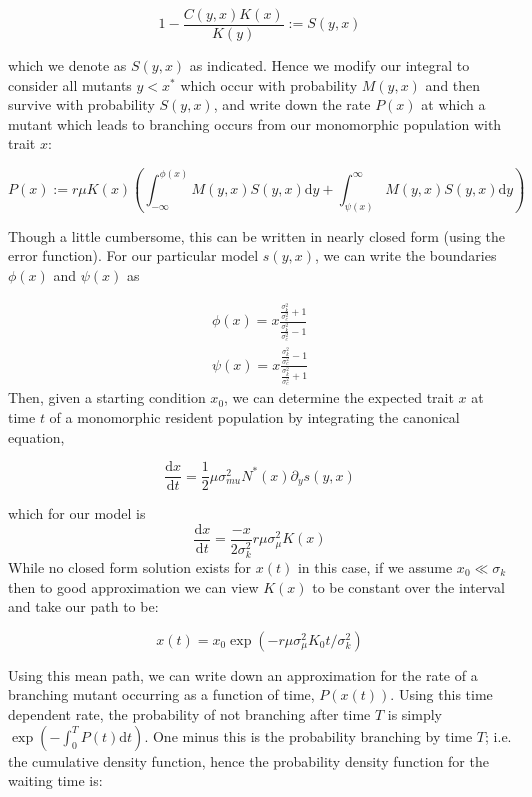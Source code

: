 \documentclass[authoryear,review,11pt]{elsarticle}
\newcommand{\ud}{\mathrm{d}}
\begin{document}
\begin{equation}
1-\frac{C(y,x)K(x)}{K(y)} := S(y,x)
\label{S}
\end{equation}

which we denote as $S(y,x)$ as indicated. Hence we modify our integral to consider all mutants $y < x^*$ which occur with probability $M(y,x)$ and then survive with probability $S(y,x)$, and write down the rate $P(x)$ at which a mutant which leads to branching occurs from our monomorphic population with trait $x$:

\begin{equation}
P(x) := r \mu K(x)\left( \int_{-\infty}^{\phi(x)} M(y,x) S(y,x) \ud y + \int_{\psi(x)}^{\infty} M(y,x) S(y,x) \ud y  \right)
\label{MSerf}
\end{equation}

Though a little cumbersome, this can be written in nearly closed form (using the error function). For our particular model $s(y,x)$, we can write the boundaries $\phi(x)$ and $\psi(x)$ as 

\begin{align}
\phi(x) = x\frac{\frac{\sigma_k^2}{\sigma_c^2}+1}{\frac{\sigma_k^2}{\sigma_c^2}-1} \nonumber \\
\psi(x) = x\frac{\frac{\sigma_k^2}{\sigma_c^2}-1}{\frac{\sigma_k^2}{\sigma_c^2}+1}
\label{phipsi}
\end{align}
Then, given a starting condition $x_0$, we can determine the expected trait $x$ at time $t$ of a monomorphic resident population by integrating the canonical equation,

\begin{equation}
\frac{\ud x}{\ud t} = \frac{1}{2} \mu \sigma_{mu}^2 N^*(x) \partial_y s(y,x)
\end{equation}

which for our model is  
\begin{equation}
\frac{\ud x}{\ud t} = \frac{-x}{2\sigma_k^2} r \mu \sigma_{\mu}^2 K(x) 
\end{equation}
While no closed form solution exists for $x(t)$ in this case, if we assume $x_0 \ll \sigma_k$ then to good approximation we can view $K(x)$ to be constant over the interval and take our path to be:

\begin{equation}
x(t) = x_0 \exp\left( -r \mu \sigma_{\mu}^2 K_0 t/\sigma_k^2\right)
\end{equation}

Using this mean path, we can write down an approximation for the rate of a branching mutant occurring as a function of time, $P(x(t))$.  Using this time dependent rate, the probability of not branching after time $T$ is simply $\exp\left( - \int_0^T P(t)\ud t \right)$.  One minus this is the probability branching by time $T$; i.e. the cumulative density function, hence the probability density function for the waiting time is:
\end{document}

